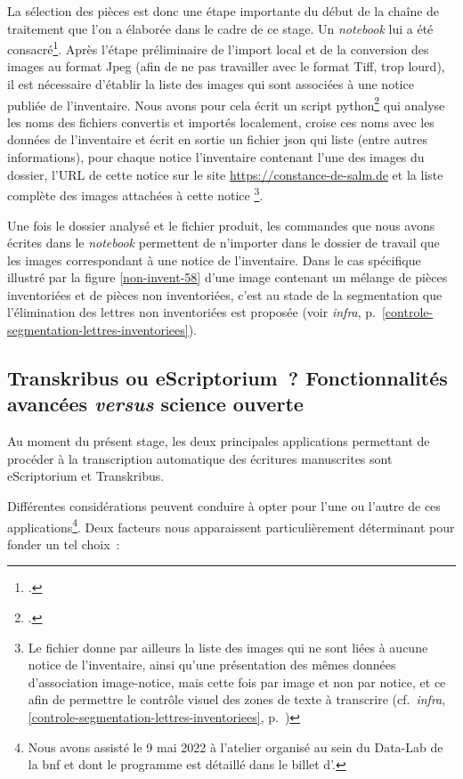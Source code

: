 \documentclass[a4paper,12pt,twoside]{book}
\begin{document}
				La sélection des pièces est donc une étape importante du début de la chaîne de traitement que l'on a élaborée dans le cadre de ce stage. Un \textit{notebook} lui a été consacré\footcite{biayPreparerTraitementDossier2022}. Après l'étape préliminaire de l'import local et de la conversion des images au format Jpeg (afin de ne pas travailler avec le format Tiff, trop lourd), il est nécessaire d'établir la liste des images qui sont associées à une notice publiée de l'inventaire. Nous avons pour cela écrit un script python\footcite{biayDonneesImagesPy2022} qui analyse les noms des fichiers convertis et importés localement, croise ces noms avec les données de l'inventaire et écrit en sortie un fichier \gls{json} qui liste (entre autres informations), pour chaque notice l'inventaire contenant l'une des images du dossier, l'URL de cette notice sur le site \url{https://constance-de-salm.de} et la liste complète des images attachées à cette notice
				\label{donnees-images}
				\footnote{Le fichier donne par ailleurs la liste des images qui ne sont liées à aucune notice de l'inventaire, ainsi qu'une présentation des mêmes données d'association image-notice, mais cette fois par image et non par notice, et ce afin de permettre le contrôle visuel des zones de texte à transcrire (cf.~\textit{infra}, \ref{controle-segmentation-lettres-inventoriees}, p.~\pageref{controle-segmentation-lettres-inventoriees})}.
				
				Une fois le dossier analysé et le fichier produit, les commandes que nous avons écrites dans le \textit{notebook} permettent de n'importer dans le dossier de travail que les images correspondant à une notice de l'inventaire. Dans le cas spécifique illustré par la figure \ref{non-invent-58} d'une image contenant un mélange de pièces inventoriées et de pièces non inventoriées, c'est au stade de la {segmentation} que l'élimination des lettres non inventoriées est proposée (voir \textit{infra}, p.~\ref{controle-segmentation-lettres-inventoriees}).
							
			\subsection[Transkribus ou eScriptorium~?]{Transkribus ou eScriptorium~? Fonctionnalités avancées \textit{versus} science ouverte}
				Au moment du présent stage, les deux principales applications permettant de procéder à la transcription automatique des écritures manuscrites sont eScriptorium et Transkribus.
				
				Différentes considérations peuvent conduire à opter pour l'une ou l'autre de ces applications\footnote{Nous avons assisté le 9 mai 2022 à l'atelier organisé au sein du Data-Lab de la \gls{bnf} et dont le programme est détaillé dans le billet d'\cite{jacquotTranskribusEScriptoriumTranscrire}.}. Deux facteurs nous apparaissent particulièrement déterminant pour fonder un tel choix~:
				
\end{document}
